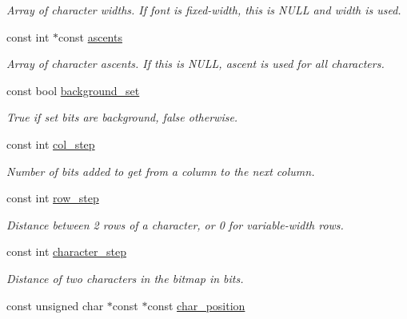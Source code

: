 \begin{DoxyCompactItemize}
\begin{DoxyCompactList}\small\item\em Array of character widths. If font is fixed-\/width, this is N\-U\-L\-L and {\itshape width\/} is used. \end{DoxyCompactList}\item 
const int $\ast$const \hyperlink{classGUI_1_1BitmapFont_ade167bd18d25f17f944c94f9c1333082}{ascents}
\begin{DoxyCompactList}\small\item\em Array of character ascents. If this is N\-U\-L\-L, {\itshape ascent\/} is used for all characters. \end{DoxyCompactList}\item 
\hypertarget{classGUI_1_1BitmapFont_acd705cf60d73c04dd028828a7b5c1da3}{const bool \hyperlink{classGUI_1_1BitmapFont_acd705cf60d73c04dd028828a7b5c1da3}{background\-\_\-set}}\label{classGUI_1_1BitmapFont_acd705cf60d73c04dd028828a7b5c1da3}

\begin{DoxyCompactList}\small\item\em True if set bits are background, false otherwise. \end{DoxyCompactList}\item 
\hypertarget{classGUI_1_1BitmapFont_ac2fab3c605018ebaa18ff59c54f29e1b}{const int \hyperlink{classGUI_1_1BitmapFont_ac2fab3c605018ebaa18ff59c54f29e1b}{col\-\_\-step}}\label{classGUI_1_1BitmapFont_ac2fab3c605018ebaa18ff59c54f29e1b}

\begin{DoxyCompactList}\small\item\em Number of bits added to get from a column to the next column. \end{DoxyCompactList}\item 
\hypertarget{classGUI_1_1BitmapFont_aff605105bf7cffd78dfce7dc24f701ac}{const int \hyperlink{classGUI_1_1BitmapFont_aff605105bf7cffd78dfce7dc24f701ac}{row\-\_\-step}}\label{classGUI_1_1BitmapFont_aff605105bf7cffd78dfce7dc24f701ac}

\begin{DoxyCompactList}\small\item\em Distance between 2 rows of a character, or 0 for variable-\/width rows. \end{DoxyCompactList}\item 
const int \hyperlink{classGUI_1_1BitmapFont_a27146558fd76b2ac1c2dc7133b23f4ce}{character\-\_\-step}
\begin{DoxyCompactList}\small\item\em Distance of two characters in the bitmap in bits. \end{DoxyCompactList}\item 
\hypertarget{classGUI_1_1BitmapFont_a95cd04a0232cd076fcb3021e85d0043b}{const unsigned char $\ast$const $\ast$const \hyperlink{classGUI_1_1BitmapFont_a95cd04a0232cd076fcb3021e85d0043b}{char\-\_\-position}}\label{classGUI_1_1BitmapFont_a95cd04a0232cd076fcb3021e85d0043b}


\end{DoxyCompactItemize}
